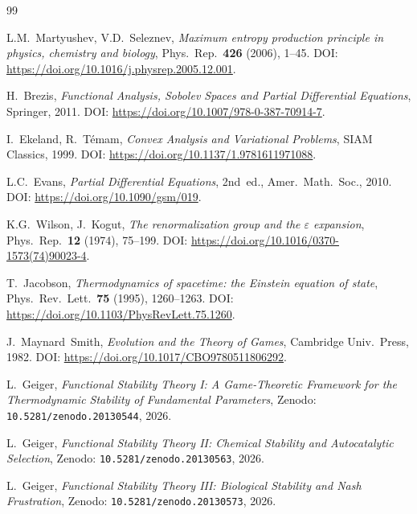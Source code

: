 \documentclass[11pt,a4paper]{article}
\theoremstyle{remark}
\begin{document}
\begin{thebibliography}{99}

L.M.~Martyushev, V.D.~Seleznev,
\emph{Maximum entropy production principle in physics, chemistry and biology},
Phys.~Rep.~\textbf{426} (2006), 1--45.
DOI: \url{https://doi.org/10.1016/j.physrep.2005.12.001}.

H.~Brezis,
\emph{Functional Analysis, Sobolev Spaces and Partial Differential Equations},
Springer, 2011.
DOI: \url{https://doi.org/10.1007/978-0-387-70914-7}.

I.~Ekeland, R.~T\'emam,
\emph{Convex Analysis and Variational Problems},
SIAM Classics, 1999.
DOI: \url{https://doi.org/10.1137/1.9781611971088}.

L.C.~Evans,
\emph{Partial Differential Equations}, 2nd~ed.,
Amer.~Math.~Soc., 2010.
DOI: \url{https://doi.org/10.1090/gsm/019}.

K.G.~Wilson, J.~Kogut,
\emph{The renormalization group and the $\varepsilon$ expansion},
Phys.~Rep.~\textbf{12} (1974), 75--199.
DOI: \url{https://doi.org/10.1016/0370-1573(74)90023-4}.

T.~Jacobson,
\emph{Thermodynamics of spacetime: the Einstein equation of state},
Phys.~Rev.~Lett.~\textbf{75} (1995), 1260--1263.
DOI: \url{https://doi.org/10.1103/PhysRevLett.75.1260}.

J.~Maynard~Smith,
\emph{Evolution and the Theory of Games},
Cambridge Univ.~Press, 1982.
DOI: \url{https://doi.org/10.1017/CBO9780511806292}.

L.~Geiger,
\emph{Functional Stability Theory I: A Game-Theoretic Framework
for the Thermodynamic Stability of Fundamental Parameters},
Zenodo: \texttt{10.5281/zenodo.20130544}, 2026.

L.~Geiger,
\emph{Functional Stability Theory II: Chemical Stability and
Autocatalytic Selection},
Zenodo: \texttt{10.5281/zenodo.20130563}, 2026.

L.~Geiger,
\emph{Functional Stability Theory III: Biological Stability and
Nash Frustration},
Zenodo: \texttt{10.5281/zenodo.20130573}, 2026.


\end{thebibliography}
\end{document}
